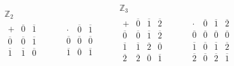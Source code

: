 \documentclass[12pt]{article}
\begin{document}
$
\begin{array}{ll}

\mathbb{Z}_2 & \\
\begin{array}{c|cc}
	+ & \overline{0} & \overline{1}\\ \hline
	\overline{0} & \overline{0} & \overline{1}\\
	\overline{1} & \overline{1} & \overline{0}
\end{array}&\qquad \begin{array}{c|cc}
\cdot & \overline{0} & \overline{1} \\ \hline
\overline{0} & \overline{0} & \overline{0} \\ 
\overline{1} & \overline{0} & \overline{1}
\end{array} 
\end{array}\qquad\begin{array}{ll}
\mathbb{Z}_3 & \\
\begin{array}{c|ccc}
+ & \overline{0} & \overline{1} & \overline{2} \\ \hline
\overline{0} & \overline{0} & \overline{1} & \overline{2} \\ 
\overline{1} & \overline{1} & \overline{2} & \overline{0} \\ 
\overline{2} & \overline{2} & \overline{0} & \overline{1}
\end{array} & \qquad\begin{array}{c|ccc}
\cdot & \overline{0} & \overline{1} & \overline{2} \\ \hline
\overline{0} & \overline{0} & \overline{0} & \overline{0} \\ 
\overline{1} & \overline{0} & \overline{1} & \overline{2} \\ 
\overline{2} & \overline{0} & \overline{2} & \overline{1}
\end{array} 
\end{array}$
\end{document}
